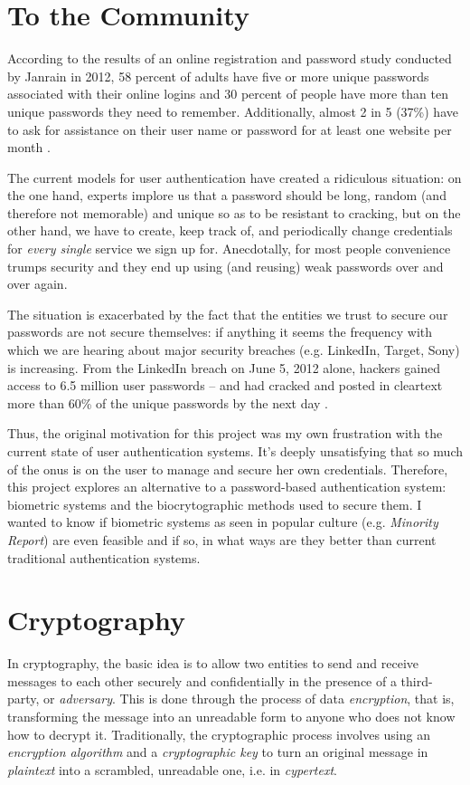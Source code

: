 \documentclass[11pt]{article}
\begin{document}
\section{To the Community}
According to the results of an online registration and password study conducted 
by Janrain in 2012, 58 percent of adults have five or more unique 
passwords associated with their online logins and 30 percent of people have 
more than ten unique passwords they need to remember. Additionally, almost 2 in 
5 (37\%) have to ask for assistance on their user name or password for at least 
one website per month \cite{Janrain12}.

The current models for user authentication have created a ridiculous situation:
on the one hand, experts implore us that a password should be long, random (and 
therefore not memorable) and unique so as to be resistant to cracking, but on
the other hand, we have to create, keep track of, and periodically change 
credentials for \textit{every single} service we sign up for. Anecdotally, for 
most people convenience trumps security and they end up using (and reusing) 
weak passwords over and over again.

The situation is exacerbated by the fact that the entities we trust to secure
our passwords are not secure themselves: if anything it seems the frequency with
which we are hearing about major security breaches (e.g. LinkedIn, Target, Sony)
is increasing. From the LinkedIn breach on June 5, 2012 alone, hackers 
gained access to 6.5 million user passwords -- and had cracked and posted 
in cleartext more than 60\% of the unique passwords by the next 
day \cite{ComputerWorld}.

Thus, the original motivation for this project was my own frustration with the
current state of user authentication systems. It's deeply unsatisfying that so 
much of the onus is on the user to manage and secure her own credentials. Therefore, this project explores an alternative to a password-based 
authentication system: biometric systems and the biocrytographic methods used 
to secure them. I wanted to know if biometric systems as seen in popular 
culture (e.g. \textit{Minority Report}) are even feasible and if so, in what 
ways are they better than current traditional authentication systems.

\section{Cryptography}
In cryptography, the basic idea is to allow two entities to send and receive 
messages to each other securely and confidentially in the presence of a 
third-party, or \textit{adversary}. This is done through the process of data 
\textit{encryption}, that is, transforming the message into an unreadable form 
to anyone who does not know how to decrypt it. Traditionally, the 
cryptographic process involves using an \textit{encryption algorithm} and 
a \textit{cryptographic key} to turn an original message in \textit{plaintext}
into a scrambled, unreadable one, i.e. in \textit{cypertext}. 
\end{document}
